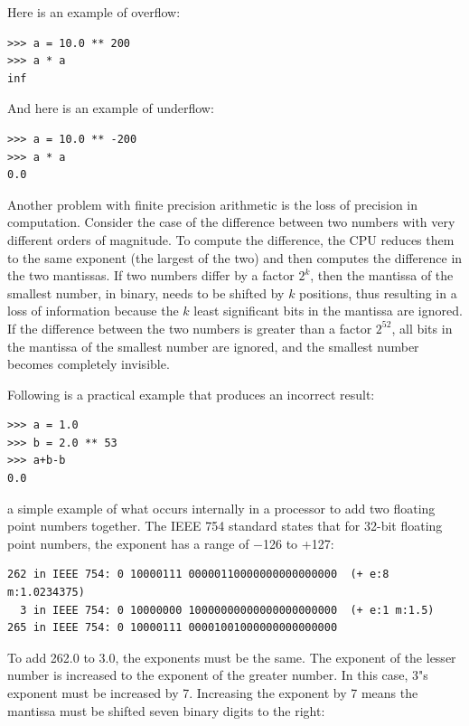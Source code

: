 \documentclass[justified, sixbynine]{tufte-book}
\theoremstyle{plain}%
\newtheorem * {corollary}{Corollary}
\theoremstyle{definition}
\theoremstyle{remark}
\newtheorem * {remark}{Remark}
\newtheorem * {note}{Note}
\begin{document}
\begin{fullwidth}
Here is an example of overflow:

\begin{lstlisting}
>>> a = 10.0 ** 200
>>> a * a
inf
\end{lstlisting}

And here is an example of underflow:

\begin{lstlisting}
>>> a = 10.0 ** -200
>>> a * a
0.0
\end{lstlisting}

Another problem with finite precision arithmetic is the loss of precision in computation. Consider the case of the difference between two numbers with very different orders of magnitude. To compute the difference, the CPU reduces them to the same exponent (the largest of the two) and then computes the difference in the two mantissas. If two numbers differ by a factor $2^k$, then the mantissa of the smallest number, in binary, needs to be shifted by $k$ positions, thus resulting in a loss of information because the $k$ least significant bits in the mantissa are ignored. If the difference between the two numbers is greater than a factor $2^{52}$, all bits in the mantissa of the smallest number are ignored, and the smallest number becomes completely invisible.

Following is a practical example that produces an incorrect result:

\begin{lstlisting}
>>> a = 1.0
>>> b = 2.0 ** 53
>>> a+b-b
0.0
\end{lstlisting}

a simple example of what occurs internally in a processor to add two floating point numbers together. The IEEE 754 standard states that for 32-bit floating point numbers, the exponent has a range of $-$126 to +127:

\begin{lstlisting}
262 in IEEE 754: 0 10000111 00000110000000000000000  (+ e:8 m:1.0234375)
  3 in IEEE 754: 0 10000000 10000000000000000000000  (+ e:1 m:1.5)
265 in IEEE 754: 0 10000111 00001001000000000000000
\end{lstlisting}

To add 262.0 to 3.0, the exponents must be the same. The exponent of the lesser number is increased to the exponent of the greater number.  In this case, 3"s exponent must be increased by 7.  Increasing the exponent by 7 means the mantissa must be shifted seven binary digits to the right:


\end{fullwidth}
\end{document}
